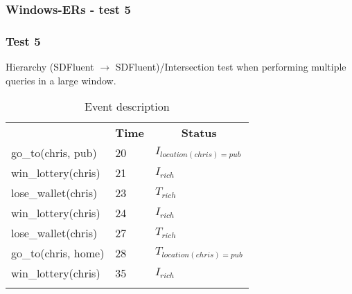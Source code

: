 \documentclass[8pt]{beamer}
\begin{document}
\begin{frame}
    \frametitle{Windows-ERs - test 5}
    \subsubsection{Test 5}
    \small
    Hierarchy (SDFluent $\rightarrow$ SDFluent)/Intersection test when performing multiple queries in a large window.\linebreak
    \begin{minipage}{0.48\linewidth}
        \begin{table}[t!]
            \caption{Event description}
            \begin{center}

                \begin{tabular}{lll}
                    \hline\noalign{\smallskip}
                    \multicolumn{1}{l}{\textbf{Event}} & \multicolumn{1}{c}{\textbf{Time}} & \multicolumn{1}{c}{\textbf{Status}}  \\
                    go\_to(chris, pub)& 20 & $I_{location(chris)=pub}$\\
                    win\_lottery(chris)&21 &$I_{rich}$\\
                    lose\_wallet(chris)& 23 &$T_{rich}$\\
                    win\_lottery(chris)& 24 &$I_{rich}$\\
                    lose\_wallet(chris)& 27 &$T_{rich}$\\
                    go\_to(chris, home)& 28 &$T_{location(chris)=pub}$\\
                    win\_lottery(chris)& 35&$I_{rich}$\\
                    \noalign{\smallskip}
                    \hline
                \end{tabular}
            \end{center}
        \end{table}
    \end{minipage}
    \begin{minipage}{0.48\linewidth}


\end{minipage}
\end{frame}
\end{document}
